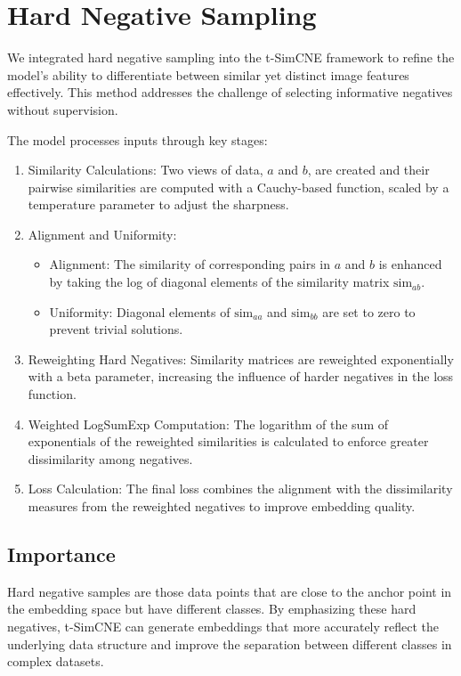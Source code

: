 \section{Hard Negative Sampling}
We integrated hard negative sampling into the t-SimCNE framework to refine the model's ability to differentiate between similar yet distinct image features effectively. This method addresses the challenge of selecting informative negatives without supervision.

The model processes inputs through key stages:

\begin{enumerate}
  \item Similarity Calculations: 
  Two views of data, \(a\) and \(b\), are created and their pairwise similarities are computed with a Cauchy-based function, scaled by a temperature parameter to adjust the sharpness.

  \item Alignment and Uniformity:
  \begin{itemize}
    \item Alignment: The similarity of corresponding pairs in \(a\) and \(b\) is enhanced by taking the log of diagonal elements of the similarity matrix \( \text{sim}_{ab} \).
    \item Uniformity: Diagonal elements of \( \text{sim}_{aa} \) and \( \text{sim}_{bb} \) are set to zero to prevent trivial solutions.
  \end{itemize}

  \item Reweighting Hard Negatives:
  Similarity matrices are reweighted exponentially with a beta parameter, increasing the influence of harder negatives in the loss function.

  \item Weighted LogSumExp Computation:
  The logarithm of the sum of exponentials of the reweighted similarities is calculated to enforce greater dissimilarity among negatives.

  \item Loss Calculation:
  The final loss combines the alignment with the dissimilarity measures from the reweighted negatives to improve embedding quality.
\end{enumerate}


\subsection{Importance}
Hard negative samples are those data points that are close to the anchor point in the embedding space but have different classes. By emphasizing these hard negatives, t-SimCNE can generate embeddings that more accurately reflect the underlying data structure and improve the separation between different classes in complex datasets.


